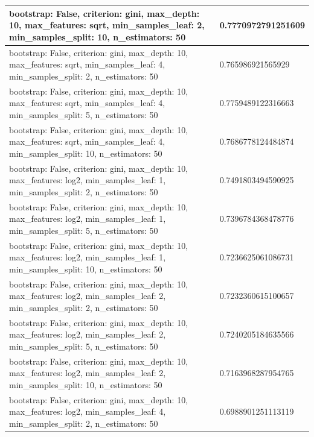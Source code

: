 \documentclass{report}
\begin{document}
{\begin{longtable}{|p{285.6px}|p{100.3px}|}
                    \hline
                    bootstrap: False, criterion: gini, max\_depth: 10, max\_features: sqrt, min\_samples\_leaf: 2, min\_samples\_split: 10, n\_estimators: 50 & 0.7770972791251609 \\
                    \hline
                    bootstrap: False, criterion: gini, max\_depth: 10, max\_features: sqrt, min\_samples\_leaf: 4, min\_samples\_split: 2, n\_estimators: 50 & 0.765986921565929 \\
                    \hline
                    bootstrap: False, criterion: gini, max\_depth: 10, max\_features: sqrt, min\_samples\_leaf: 4, min\_samples\_split: 5, n\_estimators: 50 & 0.7759489122316663 \\
                    \hline
                    bootstrap: False, criterion: gini, max\_depth: 10, max\_features: sqrt, min\_samples\_leaf: 4, min\_samples\_split: 10, n\_estimators: 50 & 0.7686778124484874 \\
                    \hline
                    bootstrap: False, criterion: gini, max\_depth: 10, max\_features: log2, min\_samples\_leaf: 1, min\_samples\_split: 2, n\_estimators: 50 & 0.7491803494590925 \\
                    \hline
                    bootstrap: False, criterion: gini, max\_depth: 10, max\_features: log2, min\_samples\_leaf: 1, min\_samples\_split: 5, n\_estimators: 50 & 0.7396784368478776 \\
                    \hline
                    bootstrap: False, criterion: gini, max\_depth: 10, max\_features: log2, min\_samples\_leaf: 1, min\_samples\_split: 10, n\_estimators: 50 & 0.7236625061086731 \\
                    \hline
                    bootstrap: False, criterion: gini, max\_depth: 10, max\_features: log2, min\_samples\_leaf: 2, min\_samples\_split: 2, n\_estimators: 50 & 0.7232360615100657 \\
                    \hline
                    bootstrap: False, criterion: gini, max\_depth: 10, max\_features: log2, min\_samples\_leaf: 2, min\_samples\_split: 5, n\_estimators: 50 & 0.7240205184635566 \\
                    \hline
                    bootstrap: False, criterion: gini, max\_depth: 10, max\_features: log2, min\_samples\_leaf: 2, min\_samples\_split: 10, n\_estimators: 50 & 0.7163968287954765 \\
                    \hline
                    bootstrap: False, criterion: gini, max\_depth: 10, max\_features: log2, min\_samples\_leaf: 4, min\_samples\_split: 2, n\_estimators: 50 & 0.6988901251113119 \\

\end{longtable}}
\end{document}
